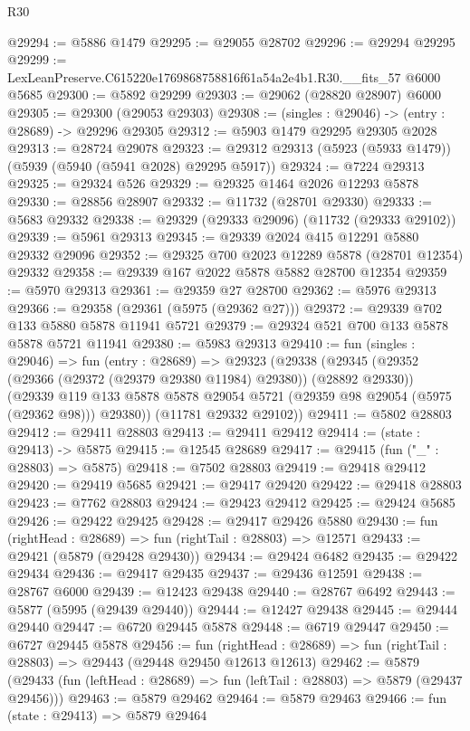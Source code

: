 \begin{lexlean}{R30}
\begin{coremodule}
@29294 := @5886 @1479
@29295 := @29055 @28702
@29296 := @29294 @29295
@29299 := LexLeanPreserve.C615220e1769868758816f61a54a2e4b1.R30.__fits_57 @6000 @5685
@29300 := @5892 @29299
@29303 := @29062 (@28820 @28907) @6000
@29305 := @29300 (@29053 @29303)
@29308 := (singles : @29046) -> (entry : @28689) -> @29296 @29305
@29312 := @5903 @1479 @29295 @29305 @2028
@29313 := @28724 @29078
@29323 := @29312 @29313 (@5923 (@5933 @1479)) (@5939 (@5940 (@5941 @2028) @29295 @5917))
@29324 := @7224 @29313
@29325 := @29324 @526
@29329 := @29325 @1464 @2026 @12293 @5878
@29330 := @28856 @28907
@29332 := @11732 (@28701 @29330)
@29333 := @5683 @29332
@29338 := @29329 (@29333 @29096) (@11732 (@29333 @29102))
@29339 := @5961 @29313
@29345 := @29339 @2024 @415 @12291 @5880 @29332 @29096
@29352 := @29325 @700 @2023 @12289 @5878 (@28701 @12354) @29332
@29358 := @29339 @167 @2022 @5878 @5882 @28700 @12354
@29359 := @5970 @29313
@29361 := @29359 @27 @28700
@29362 := @5976 @29313
@29366 := @29358 (@29361 (@5975 (@29362 @27)))
@29372 := @29339 @702 @133 @5880 @5878 @11941 @5721
@29379 := @29324 @521 @700 @133 @5878 @5878 @5721 @11941
@29380 := @5983 @29313
@29410 := fun (singles : @29046) =>
  fun (entry : @28689) =>
  @29323
    (@29338
      (@29345
        (@29352 (@29366 (@29372 (@29379 @29380 @11984) @29380)) (@28892 @29330))
        (@29339 @119 @133 @5878 @5878 @29054 @5721 (@29359 @98 @29054 (@5975 (@29362 @98))) @29380))
      (@11781 @29332 @29102))
@29411 := @5802 @28803
@29412 := @29411 @28803
@29413 := @29411 @29412
@29414 := (state : @29413) -> @5875
@29415 := @12545 @28689
@29417 := @29415 (fun ("_" : @28803) => @5875)
@29418 := @7502 @28803
@29419 := @29418 @29412
@29420 := @29419 @5685
@29421 := @29417 @29420
@29422 := @29418 @28803
@29423 := @7762 @28803
@29424 := @29423 @29412
@29425 := @29424 @5685
@29426 := @29422 @29425
@29428 := @29417 @29426 @5880
@29430 := fun (rightHead : @28689) => fun (rightTail : @28803) => @12571
@29433 := @29421 (@5879 (@29428 @29430))
@29434 := @29424 @6482
@29435 := @29422 @29434
@29436 := @29417 @29435
@29437 := @29436 @12591
@29438 := @28767 @6000
@29439 := @12423 @29438
@29440 := @28767 @6492
@29443 := @5877 (@5995 (@29439 @29440))
@29444 := @12427 @29438
@29445 := @29444 @29440
@29447 := @6720 @29445 @5878
@29448 := @6719 @29447
@29450 := @6727 @29445 @5878
@29456 := fun (rightHead : @28689) =>
  fun (rightTail : @28803) => @29443 (@29448 @29450 @12613 @12613)
@29462 := @5879
    (@29433 (fun (leftHead : @28689) => fun (leftTail : @28803) => @5879 (@29437 @29456)))
@29463 := @5879 @29462
@29464 := @5879 @29463
@29466 := fun (state : @29413) => @5879 @29464

\end{coremodule}
\end{lexlean}
